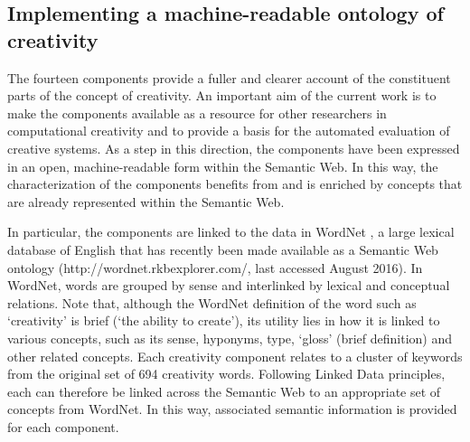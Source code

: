 \documentclass[10pt,letterpaper]{article}
\begin{document}
\subsection*{Implementing a machine-readable ontology of creativity}\label{creativityOntology}

The fourteen components provide a fuller and clearer account of the constituent parts of the concept of creativity. An important aim of the current work is to make the components available as a resource for other researchers in computational creativity and to provide a basis for the automated evaluation of creative systems. As a step in this direction, the components have been expressed in an open, machine-readable form within the Semantic Web. In this way, the characterization of the components benefits from and is enriched by concepts that are already represented within the Semantic Web. %

In particular, the components are linked to the data in WordNet \cite{fellbaum98}, a large lexical database of English that has recently been made available as a Semantic Web ontology (http://wordnet.rkbexplorer.com/, last accessed August 2016). In WordNet, words are grouped by sense and interlinked by lexical and conceptual relations. Note that, although the WordNet definition of the word such as `creativity' is brief (`the ability to create'), its utility lies in how it is linked to various concepts, such as its sense, hyponyms, type, `gloss' (brief definition) and other related concepts. Each creativity component relates to a cluster of keywords from the original set of 694 creativity words. Following Linked Data principles, each can therefore be linked across the Semantic Web to an appropriate set of concepts from WordNet. In this way,  associated semantic information is provided for each component. 
\end{document}
